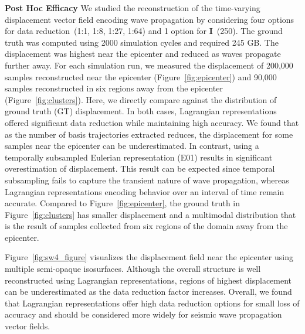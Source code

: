 \noindent\textbf{Post Hoc Efficacy}
We studied the reconstruction of the time-varying displacement vector field encoding wave propagation by considering four options for data reduction~(1:1, 1:8, 1:27, 1:64) and 1 option for \textbf{I}~(250).
%
The ground truth was computed using 2000 simulation cycles and required 245 GB.
%
The displacement was highest near the epicenter and reduced as waves propagate further away.
%
For each simulation run, we measured the displacement of 200,000 samples reconstructed near the epicenter (Figure~\ref{fig:epicenter}) and 90,000 samples reconstructed in six regions away from the epicenter (Figure~\ref{fig:clusters}).
%
Here, we directly compare against the distribution of ground truth (GT) displacement.
%
In both cases, Lagrangian representations offered significant data reduction while maintaining high accuracy.
%
We found that as the number of basis trajectories extracted reduces, the displacement for some samples near the epicenter can be underestimated. 
%
In contrast, using a temporally subsampled Eulerian representation (E01) results in significant overestimation of displacement.
%
This result can be expected since temporal subsampling fails to capture the transient nature of wave propagation, whereas Lagrangian representations encoding behavior over an interval of time remain accurate.
%
Compared to Figure~\ref{fig:epicenter}, the ground truth in Figure~\ref{fig:clusters} has smaller displacement and a multimodal distribution that is the result of samples collected from six regions of the domain away from the epicenter. 
%

Figure~\ref{fig:sw4_figure} visualizes the displacement field near the epicenter using multiple semi-opaque isosurfaces.
%
Although the overall structure is well reconstructed using Lagrangian representations, regions of highest displacement can be underestimated as the data reduction factor increases.
%
Overall, we found that Lagrangian representations offer high data reduction options for small loss of accuracy and should be considered more widely for seismic wave propagation vector fields.


